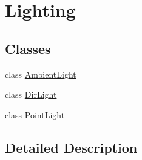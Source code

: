 \hypertarget{group__gr___lighting}{}\section{Lighting}
\label{group__gr___lighting}
\subsection*{Classes}
\begin{DoxyCompactItemize}
\item 
class \hyperlink{class_ambient_light}{Ambient\+Light}
\item 
class \hyperlink{class_dir_light}{Dir\+Light}
\item 
class \hyperlink{class_point_light}{Point\+Light}
\end{DoxyCompactItemize}


\subsection{Detailed Description}
